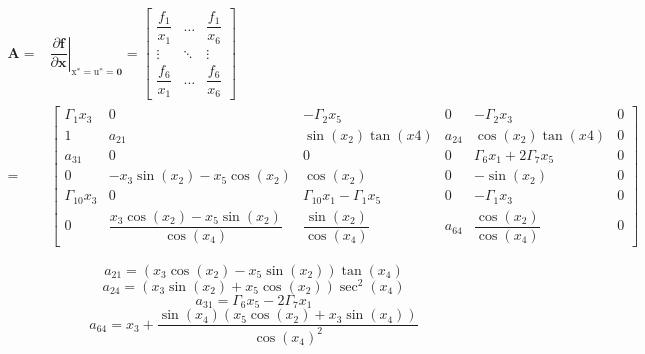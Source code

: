 \documentclass[3p]{elsarticle}
\begin{document}
\begin{align}
    \mathbf{A} =& \left.\dfrac{\partial \mathbf{f}}{\partial \mathbf{x}}\right|_{\boldsymbol{{\mathrm{x}}}^*= \boldsymbol{{\mathrm{u}}}^*=\boldsymbol{0}} = \begin{bmatrix}
        \dfrac{f_1}{x_1} & \dots & \dfrac{f_1}{x_6} \\
        \vdots & \ddots & \vdots \\
        \dfrac{f_6}{x_1} & \dots & \dfrac{f_6}{x_6}
    \end{bmatrix} \\ =&\begin{bmatrix}
        \Gamma_1 x_3 & 0 & -\Gamma_2 x_5  & 0 &  - \Gamma_2 x_3 & 0 \\
        1 & a_{21} & \sin(x_2)\tan(x4) & a_{24} & \cos(x_2)\tan(x4) & 0 \\
        a_{31} & 0 & 0 & 0 & \Gamma_6 x_1 + 2\Gamma_7 x_5 & 0 \\
        0 & -x_3\sin(x_2) - x_5\cos(x_2)  & \cos(x_2) & 0 & -\sin(x_2) & 0 \\
        \Gamma_{10} x_3 & 0 & \Gamma_{10} x_1 - \Gamma_1 x_5 & 0 & -\Gamma_1 x_3 & 0 \\
        0 & \dfrac{x_3\cos(x_2)-x_5\sin(x_2)}{\cos(x_4)} & \dfrac{\sin(x_2)}{\cos(x_4)} & a_{64} & \dfrac{\cos(x_2)}{\cos(x_4)} & 0
    \end{bmatrix}
\end{align}

$$
a_{21} = (x_3\cos(x_2)-x_5\sin(x_2))\tan(x_4)
$$
$$
a_{24} = (x_3\sin(x_2)+x_5\cos(x_2))\sec^2(x_4)
$$
$$
a_{31} = \Gamma_6 x_5 - 2\Gamma_7 x_1
$$
$$
a_{64} = x_3 + \dfrac{\sin(x_4)(x_5\cos(x_2) + x_3\sin(x_4))}{\cos(x_4)^2}
$$
\end{document}
